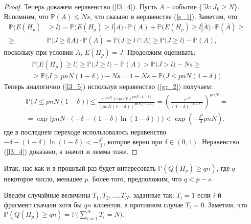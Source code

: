 \documentclass[10pt]{article}
\newcommand{\PRob}{\mathbb P}
\newcommand{\leqs}{\leqslant}
\newcommand{\geqs}{\geqslant}
\theoremstyle{named}
\begin{document}
\begin{proof}
Теперь докажем неравенство (\ref{l3_4}). Пусть $A$ -- событие $\{\exists k : J_k \geqs N\}$.
Вспомним, что $\PRob(A) \leqs Ns$, что сказано в неравенстве (\ref{s_1}). Заметим, что
\begin{equation}\begin{aligned}
\PRob\big( E(H_p) &\geqs l \big) = 
	\PRob\big(E(H_p) \geqs l | A\big) \cdot \PRob(A) + \PRob\big(E(H_p) \geqs l | \overline{A}\big) \cdot \PRob(\overline{A})
\geqs
\\
\geqs
&\PRob\big(J \geqs l | \overline{A}\big) \cdot \PRob(\overline{A})
	=
\PRob\big(J \geqs l \cap \overline{A} \big) 
	\geqs
\PRob\big(J \geqs l \big) - \PRob(A),
\end{aligned}\end{equation}
поскольку при условии $\overline{A}$, $E(H_p) = J$. Продолжим оценивать:
\begin{equation}\begin{aligned}
\PRob\big( E(H_p) \geqs l \big) 
	\geqs 
\PRob\big(J \geqs l \big) - \PRob(A) 
	>
\PRob\big(J > l \big) - Ns
	\geqs
\\
	\geqs
\PRob\big(J > pnN(1-\delta) \big) - Ns
	=
1 - Ns - \PRob\big( J \leqs pnN(1-\delta)  \big).
\end{aligned}\end{equation}
Теперь аналогично (\ref{l3_5}) используя неравенство (\ref{gr_2}) получаем:
\begin{equation}\begin{aligned}
\PRob\big( J \leqs pnN(1-\delta) \big) 
	\leqs
\frac{
	e^{-pnN}(epnN)^{pnN(1-\delta)}
}{
	(pnN(1-\delta))^{pnN(1-\delta)}
}
	=
\left( \frac{e^{-\delta}}{(1-\delta)^{(1-\delta)}} \right)^{pnN}
	=
\\
	=
\exp\big(pnN \cdot (-\delta - (1-\delta)\ln(1-\delta)) \big)
	<
\exp\left(-\frac{\delta^2}{4}pnN\right),
\end{aligned}\end{equation}
где в последнем переходе использовалось неравенство $-\delta - (1-\delta)\ln(1-\delta) < - \frac{\delta^2}{4}$, 
которое верно при $\delta \in (0,1)$. Неравенство (\ref{l3_4}) доказано, а значит и лемма тоже.
\end{proof}

Итак, нас как и в прошлый раз будет интересовать $\PRob(Q(H_p) \geqs qn)$, где $q$ некоторое число, меньшее $p$.
Более того, предположим, что $q < p - s$.

Введём случайные величины $T_1, T_2, \dots, T_N$, заданные так: $T_i = 1$ если $i$-й фрагмент скачали хотя бы $qn$ клиентов, 
в противном случае $T_i = 0$. Заметим, что $\PRob(Q(H_p) \geqs qn) = \PRob\big(\sum\limits_{i=1}^N T_i = N\big)$.
\end{document}
